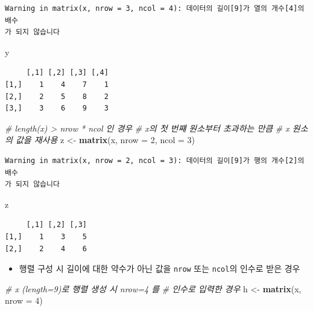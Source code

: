 \documentclass[
  11pt,
]{krantz}
\newenvironment{Shaded}{\begin{snugshade}}{\end{snugshade}}
\newcommand{\CommentTok}[1]{\textcolor[rgb]{0.37,0.37,0.37}{\textit{#1}}}
\newcommand{\DataTypeTok}[1]{\textcolor[rgb]{0.27,0.27,0.27}{#1}}
\newcommand{\DecValTok}[1]{\textcolor[rgb]{0.06,0.06,0.06}{#1}}
\newcommand{\KeywordTok}[1]{\textcolor[rgb]{0.27,0.27,0.27}{\textbf{#1}}}
\newcommand{\NormalTok}[1]{#1}
\newcommand{\StringTok}[1]{\textcolor[rgb]{0.5,0.5,0.5}{#1}}
\providecommand{\tightlist}{%
  \setlength{\itemsep}{0pt}\setlength{\parskip}{0pt}}
\begin{document}
\begin{verbatim}
Warning in matrix(x, nrow = 3, ncol = 4): 데이터의 길이[9]가 열의 개수[4]의 배수
가 되지 않습니다
\end{verbatim}

\begin{Shaded}
\begin{Highlighting}[]
\NormalTok{y}
\end{Highlighting}
\end{Shaded}

\begin{verbatim}
     [,1] [,2] [,3] [,4]
[1,]    1    4    7    1
[2,]    2    5    8    2
[3,]    3    6    9    3
\end{verbatim}

\begin{Shaded}
\begin{Highlighting}[]
\CommentTok{# length(x) > nrow * ncol 인 경우 }
\CommentTok{# x의 첫 번쨰 원소부터 초과하는 만큼 }
\CommentTok{# x 원소의 값을 재사용}
\NormalTok{z <-}\StringTok{ }\KeywordTok{matrix}\NormalTok{(x, }\DataTypeTok{nrow =} \DecValTok{2}\NormalTok{, }\DataTypeTok{ncol =} \DecValTok{3}\NormalTok{)}
\end{Highlighting}
\end{Shaded}

\begin{verbatim}
Warning in matrix(x, nrow = 2, ncol = 3): 데이터의 길이[9]가 행의 개수[2]의 배수
가 되지 않습니다
\end{verbatim}

\begin{Shaded}
\begin{Highlighting}[]
\NormalTok{z}
\end{Highlighting}
\end{Shaded}

\begin{verbatim}
     [,1] [,2] [,3]
[1,]    1    3    5
[2,]    2    4    6
\end{verbatim}

\normalsize

\begin{itemize}
\tightlist
\item
  행렬 구성 시 길이에 대한 약수가 아닌 값을 \texttt{nrow} 또는 \texttt{ncol}의 인수로 받은 경우
\end{itemize}

\footnotesize

\begin{Shaded}
\begin{Highlighting}[]
\CommentTok{# x (length=9)로 행렬 생성 시 nrow=4 를}
\CommentTok{# 인수로 입력한 경우}
\NormalTok{h <-}\StringTok{ }\KeywordTok{matrix}\NormalTok{(x, }\DataTypeTok{nrow =} \DecValTok{4}\NormalTok{)}
\end{Highlighting}
\end{Shaded}
\end{document}
